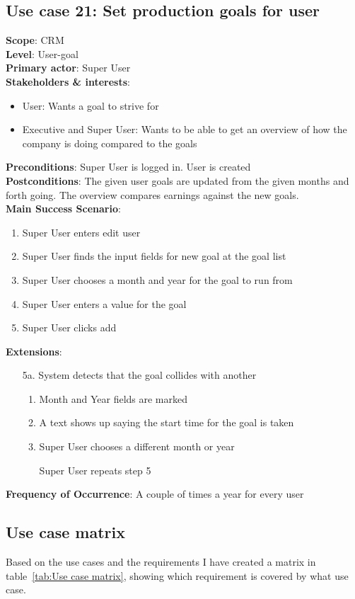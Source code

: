 \subsection{Use case 21: Set production goals for user}
\textbf{Scope}: CRM \\
\textbf{Level}: User-goal \\
\textbf{Primary actor}: Super User \\
\textbf{Stakeholders \& interests}:
\begin{itemize}
  \item User: Wants a goal to strive for
  \item Executive and Super User: Wants to be able to get an overview of how the
    company is doing compared to the goals 
\end{itemize}
\textbf{Preconditions}: Super User is logged in. User is created \\
\textbf{Postconditions}: The given user goals are updated from the given months
and forth going. The overview compares earnings against the new goals.\\ 
\textbf{Main Success Scenario}:
\begin{enumerate}
  \item Super User enters edit user
  \item Super User finds the input fields for new goal at the goal list
  \item Super User chooses a month and year for the goal to run from
  \item Super User enters a value for the goal
  \item Super User clicks add
\end{enumerate}
\textbf{Extensions}:
\begin{itemize}
  \item [5a.] System detects that the goal collides with another
  \begin{enumerate}
    \item Month and Year fields are marked
    \item A text shows up saying the start time for the goal is taken
    \item Super User chooses a different month or year
    \item [] Super User repeats step 5
  \end{enumerate}
\end{itemize}
\textbf{Frequency of Occurrence}: A couple of times a year for every user

\subsection{Use case matrix}
\label{sub:Use case matrix}
Based on the use cases and the requirements I have created a matrix in table~\ref{tab:Use case matrix}, showing which requirement is covered by what use case.

